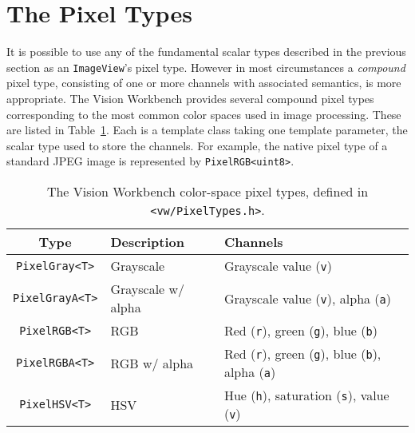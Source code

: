 \section{The Pixel Types}

It is possible to use any of the fundamental scalar types described in
the previous section as an \verb#ImageView#'s pixel type.  However in
most circumstances a {\it compound} pixel type, consisting of one or
more channels with associated semantics, is more appropriate.  The 
Vision Workbench provides several compound pixel types corresponding 
to the most common color spaces used in image processing.  These are 
listed in Table~\ref{tbl:color-pixel-types}.  Each is a template 
class taking one template parameter, the scalar type used to store 
the channels.  For example, the native pixel type of a standard JPEG 
image is represented by \verb#PixelRGB<uint8>#.

\begin{table}[t]\begin{centering}
\begin{tabular}{|c|l|l|} \hline
Type & Description & Channels \\ \hline \hline
\verb#PixelGray<T># & Grayscale & Grayscale value (\verb#v#) \\ \hline
\verb#PixelGrayA<T># & Grayscale w/ alpha & Grayscale value (\verb#v#), alpha (\verb#a#) \\ \hline
\verb#PixelRGB<T># & RGB & Red (\verb#r#), green (\verb#g#), blue (\verb#b#) \\ \hline
\verb#PixelRGBA<T># & RGB w/ alpha &  Red (\verb#r#), green (\verb#g#), blue (\verb#b#), alpha (\verb#a#) \\ \hline
\verb#PixelHSV<T># & HSV & Hue (\verb#h#), saturation (\verb#s#), value (\verb#v#) \\ \hline
\end{tabular}
\caption{The Vision Workbench color-space pixel types, defined in {\tt <vw/PixelTypes.h>}.}
\label{tbl:color-pixel-types}
\end{centering}\end{table}

